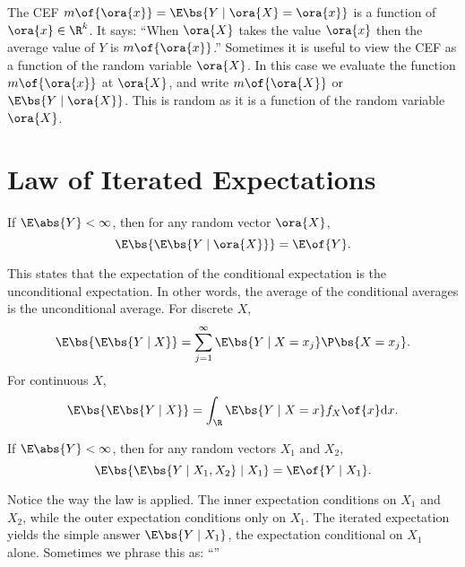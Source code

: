 The CEF $m\of{{{\ora{x}}}} = \E\bs{Y \mid \ora{X} = \ora{x}}$ is a function of $\ora{x} \in \R^k$. It says: ``When $\ora{X}$ takes the value $\ora{x}$ then the average value of $Y$ is $m\of{\ora{x}}$.'' Sometimes it is useful to view the CEF as a function of the random variable $\ora{X}$. In this case we evaluate the function $m\of{\ora{x}}$ at $\ora{X}$, and write $m\of{\ora{X}}$ or $\E\bs{Y \mid \ora{X}}$. This is random as it is a function of the random variable $\ora{X}$.


\setcounter{section}{6}

\section{Law of Iterated Expectations}

\begin{theorem}
    If $\E \abs{Y} < \infty$, then for any random vector $\ora{X}$, $$\E\bs{\E\bs{Y \mid \ora{X}}} = \E\of{Y}.$$
\end{theorem}

This states that the expectation of the conditional expectation is the unconditional expectation. In other words, the average of the conditional averages is the unconditional average. For discrete $X$,
\begin{equation}
    \notag 
    \E\bs{\E\bs{Y \mid X}} = \sum_{j=1}^{\infty} \E\bs{Y \mid X = x_j} \P\bs{X = x_j}.
\end{equation}
For continuous $X$,
\begin{equation}
    \notag 
    \E\bs{\E\bs{Y \mid X}} = \int_{\R} \E\bs{Y \mid X = x} f_{X}\of{x} \mathrm{d} x.
\end{equation}

\begin{theorem}
    If $\E \abs{Y} < \infty$, then for any random vectors $X_1$ and $X_2$, $$\E\bs{\E\bs{Y \mid X_1, X_2} \mid X_1} = \E\of{Y \mid X_1}.$$
\end{theorem}

Notice the way the law is applied. The inner expectation conditions on $X_1$ and $X_2$, while the outer expectation conditions only on $X_1$. The iterated expectation yields the simple answer $\E\bs{Y \mid X_1}$, the expectation conditional on $X_1$ alone. Sometimes we phrase this as: ``''

